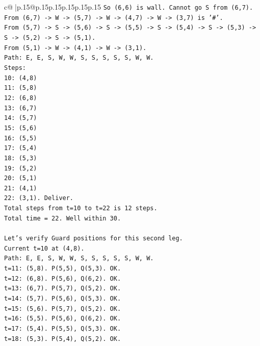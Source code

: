 \documentclass{article}
\begin{document}
{\begin{supertabular}{c@{$\;$}|p{.15\linewidth}@{}p{.15\linewidth}p{.15\linewidth}p{.15\linewidth}p{.15\linewidth}p{.15\linewidth}}
{{{\texttt{So (6,6) is wall. Cannot go S from (6,7).} \\
\texttt{From (6,7) {-}> W {-}> (5,7) {-}> W {-}> (4,7) {-}> W {-}> (3,7) is '\#'.} \\
\texttt{From (5,7) {-}> S {-}> (5,6) {-}> S {-}> (5,5) {-}> S {-}> (5,4) {-}> S {-}> (5,3) {-}> S {-}> (5,2) {-}> S {-}> (5,1).} \\
\texttt{From (5,1) {-}> W {-}> (4,1) {-}> W {-}> (3,1).} \\
\texttt{Path: E, E, S, W, W, S, S, S, S, S, W, W.} \\
\texttt{Steps:} \\
\texttt{10: (4,8)} \\
\texttt{11: (5,8)} \\
\texttt{12: (6,8)} \\
\texttt{13: (6,7)} \\
\texttt{14: (5,7)} \\
\texttt{15: (5,6)} \\
\texttt{16: (5,5)} \\
\texttt{17: (5,4)} \\
\texttt{18: (5,3)} \\
\texttt{19: (5,2)} \\
\texttt{20: (5,1)} \\
\texttt{21: (4,1)} \\
\texttt{22: (3,1). Deliver.} \\
\texttt{Total steps from t=10 to t=22 is 12 steps.} \\
\texttt{Total time = 22. Well within 30.} \\
\\ 
\texttt{Let's verify Guard positions for this second leg.} \\
\texttt{Current t=10 at (4,8).} \\
\texttt{Path: E, E, S, W, W, S, S, S, S, S, W, W.} \\
\texttt{t=11: (5,8). P(5,5), Q(5,3). OK.} \\
\texttt{t=12: (6,8). P(5,6), Q(6,2). OK.} \\
\texttt{t=13: (6,7). P(5,7), Q(5,2). OK.} \\
\texttt{t=14: (5,7). P(5,6), Q(5,3). OK.} \\
\texttt{t=15: (5,6). P(5,7), Q(5,2). OK.} \\
\texttt{t=16: (5,5). P(5,6), Q(6,2). OK.} \\
\texttt{t=17: (5,4). P(5,5), Q(5,3). OK.} \\
\texttt{t=18: (5,3). P(5,4), Q(5,2). OK.} \\
}}}
\end{supertabular}}
\end{document}
